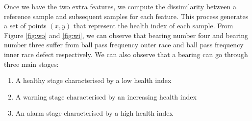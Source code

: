 \documentclass[11pt, oneside]{article}   	%
\begin{document}
\begin{flushleft}
Once we have the two extra features, we compute the dissimilarity between a reference sample and subsequent samples for each feature. 
This process generates a set of points $(x,y)$ that represent the health index of each sample. From Figure \ref{fig:wo} and \ref{fig:wi}, we can observe that bearing number four and bearing number three suffer from ball pass frequency outer race and ball pass frequency inner race defect respectively. We can also observe that a bearing can go through three main stages:
\begin{enumerate}
\item A healthy stage characterised by a low health index
\item A warning stage characterised by an increasing health index
\item An alarm stage characterised by a high health index
\end{enumerate}



\end{flushleft}
\end{document}
